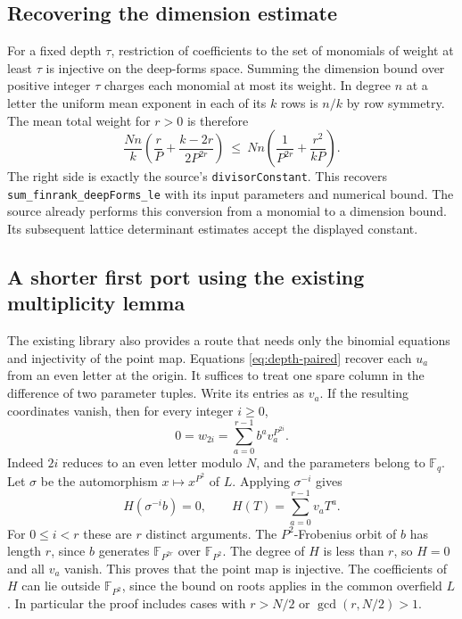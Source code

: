 \documentclass[11pt,letterpaper]{article}
\begin{document}
\subsection{Recovering the dimension estimate}

For a fixed depth $\tau$, restriction of coefficients to the set of monomials of weight at least $\tau$ is injective on the deep-forms space. Summing the dimension bound over positive integer $\tau$ charges each monomial at most its weight. In degree $n$ at a letter the uniform mean exponent in each of its $k$ rows is $n/k$ by row symmetry. The mean total weight for $r>0$ is therefore
\[
 \frac{Nn}{k}\left(\frac{r}{P}+\frac{k-2r}{2P^{2r}}\right)
 \ \leq\ Nn\left(\frac{1}{P^{2r}}+\frac{r^2}{kP}\right).
\]
The right side is exactly the source's \texttt{divisorConstant}. This recovers \texttt{sum\_finrank\_deepForms\_le} with its input parameters and numerical bound. The source already performs this conversion from a monomial to a dimension bound. Its subsequent lattice determinant estimates accept the displayed constant.

\subsection{A shorter first port using the existing multiplicity lemma}

The existing library also provides a route that needs only the binomial equations and injectivity of the point map. Equations \eqref{eq:depth-paired} recover each $u_a$ from an even letter at the origin. It suffices to treat one spare column in the difference of two parameter tuples. Write its entries as $v_a$. If the resulting coordinates vanish, then for every integer $i\geq 0$,
\[
 0=w_{2i}=\sum_{a=0}^{r-1} b^a v_a^{P^{2i}} .
\]
Indeed $2i$ reduces to an even letter modulo $N$, and the parameters belong to $\mathbb F_q$. Let $\sigma$ be the automorphism $x\mapsto x^{P^2}$ of $L$. Applying $\sigma^{-i}$ gives
\[
 H(\sigma^{-i}b)=0,
 \qquad H(T)=\sum_{a=0}^{r-1}v_a T^a.
\]
For $0\leq i<r$ these are $r$ distinct arguments. The $P^2$-Frobenius orbit of $b$ has length $r$, since $b$ generates $\mathbb F_{P^{2r}}$ over $\mathbb F_{P^2}$. The degree of $H$ is less than $r$, so $H=0$ and all $v_a$ vanish. This proves that the point map is injective. The coefficients of $H$ can lie outside $\mathbb F_{P^2}$, since the bound on roots applies in the common overfield $L$. In particular the proof includes cases with $r>N/2$ or $\gcd(r,N/2)>1$.
\end{document}
